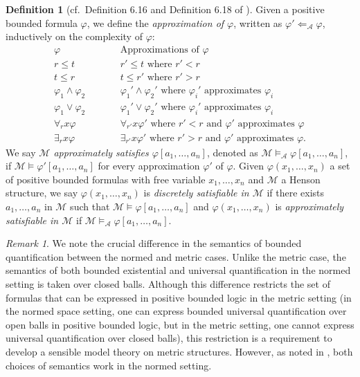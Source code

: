 \documentclass[11pt]{amsart}
\theoremstyle{definition}
\newtheorem{definition}[theorem]{Definition}
\theoremstyle{remark}
\newtheorem{remark}[theorem]{Remark}
\begin{document}
\begin{definition}[cf.\ Definition 6.16 and Definition 6.18 of \cite{DI2017}]
Given a positive bounded formula $\varphi$, we define the \emph{approximation of $\varphi$}, written as $\varphi'\Leftarrow_{\mathcal{A}}\varphi$, inductively on the complexity of $\varphi$:
\begin{eqnarray*}
\varphi  &\qquad& \text{Approximations of } \varphi\\
r\leq t &\qquad& r'\leq t \text{ where } r'<r\\
t\leq r &\qquad& t\leq r' \text{ where } r'>r\\
\varphi_1\wedge \varphi_2 &\qquad& \varphi_1'\wedge\varphi_2'  \text{ where $\varphi_i'$ approximates $\varphi_i$} \\
\varphi_1\vee \varphi_2 &\qquad& \varphi_1'\vee\varphi_2'  \text{ where $\varphi_i'$ approximates $\varphi_i$} \\
\forall_r x \varphi &\qquad& \forall_{r'} x \varphi' \text{ where } r'<r \text{ and $\varphi'$ approximates $\varphi$}\\
\exists_r x \varphi &\qquad& \exists_{r'} x \varphi' \text{ where } r'>r \text{ and $\varphi'$ approximates $\varphi$}.
\end{eqnarray*}
We say \emph{$\mathcal{M}$ approximately satisfies $\varphi[a_1,\ldots,a_n]$}, denoted as $\mathcal{M}\models_{\mathcal{A}} \varphi[a_1,\ldots,a_n]$, if $\mathcal{M}\models \varphi'[a_1,\ldots,a_n]$ for every approximation $\varphi'$ of $\varphi$. Given $\varphi(x_1,\ldots, x_n)$ a set of positive bounded formulas with free variable $x_1,\ldots, x_n$ and $\mathcal{M}$ a Henson structure,  we say $\varphi(x_1,\ldots, x_n)$ is \emph{discretely satisfiable in $\mathcal{M}$} if there exists $a_1,\ldots,a_n$ in $\mathcal{M}$ such that $\mathcal{M}\models \varphi[a_1,\ldots, a_n]$ and $\varphi(x_1,\ldots, x_n)$ is \emph{approximately satisfiable in $\mathcal{M}$} if $\mathcal{M}\models_{\mathcal{A}} \varphi[a_1,\ldots, a_n]$.
\end{definition}
\begin{remark}
\label{rem:met:vs:normed}
We note the crucial difference in the semantics of bounded quantification between the normed and metric cases. Unlike the metric case, the semantics of both bounded existential and universal quantification in the normed setting \cite{henson2002ultraproducts} is taken over closed balls. Although this difference restricts the set of formulas that can be expressed in positive bounded logic in the metric setting (in the normed space setting, one can express bounded universal quantification over open balls in positive bounded logic, but in the metric setting, one cannot express universal quantification over closed balls), this restriction is a requirement to develop a sensible model theory on metric structures. However, as noted in \cite{henson2002ultraproducts}, both choices of semantics work in the normed setting.   
\end{remark}
\end{document}
